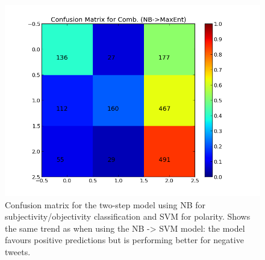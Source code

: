 \begin{minipage}[t!]{\linewidth}
\begin{minipage}{0.45\linewidth}
\begin{figure}[H]
               \includegraphics[width=\linewidth]{../img/plots/grid/confusion_matrix_Comb-NB-MaxEnt.png}
           \caption[The confusion matrix for two-step NB -> MaxEnt]{Confusion matrix for the two-step model using NB for subjectivity/objectivity classification and SVM for polarity. Shows the same trend as when using the NB -> SVM model: the model favours positive predictions but is performing better for negative tweets.}
           \label{fig:confmat_nb_maxent}
          \end{figure}
     \end{minipage}
\end{minipage}

